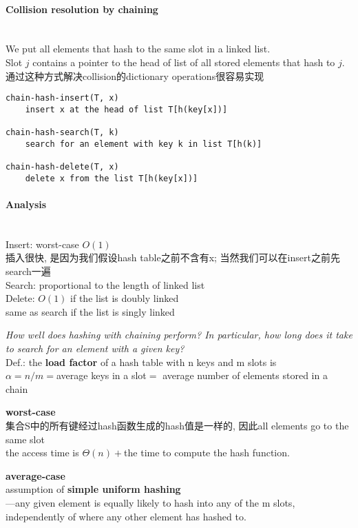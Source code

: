 \documentclass{article}
\begin{document}
\paragraph{Collision resolution by chaining}~\\
We put all elements that hash to the same slot in a linked list.\\
Slot $j$ contains a pointer to the head of list of all stored elements that hash to $j$.\\
通过这种方式解决collision的dictionary operations很容易实现

\begin{verbatim}
chain-hash-insert(T, x)
    insert x at the head of list T[h(key[x])]

chain-hash-search(T, k)
    search for an element with key k in list T[h(k)]

chain-hash-delete(T, x)
    delete x from the list T[h(key[x])]
\end{verbatim}

\paragraph{Analysis}~\\
Insert: worst-case $O(1)$\\
插入很快, 是因为我们假设hash table之前不含有x; 当然我们可以在insert之前先search一遍\\
Search: proportional to the length of linked list\\
Delete: $O(1)$ if the list is doubly linked\\
	same as search if the list is singly linked

\textit{How well does hashing with chaining perform? In particular, how long does it take to search for an element with a given key?}\\
Def.: the \textbf{load factor} of a hash table with n keys and m slots is\\
$\alpha = n/m =$average keys in a slot$=$ average number of elements stored in a chain

\textbf{worst-case}\\
集合S中的所有键经过hash函数生成的hash值是一样的, 因此all elements go to the same slot\\
the access time is $\Theta(n) + $the time to compute the hash function.

\textbf{average-case}\\
assumption of \textbf{simple uniform hashing}\\
---any given element is equally likely to hash into any of the m slots, independently of where any other element has hashed to.
\end{document}
